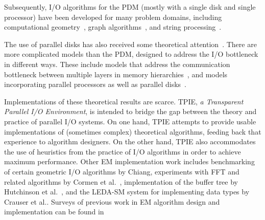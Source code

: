 Subsequently, I/O algorithms for the PDM (mostly with a
single disk and single processor) have been developed for
many problem domains, including computational
geometry~\cite{goodrich:external,arge:buffer,arge:theory,arge:gis,aamvv-empgbtag97,arge:interval,kanellakis:indexing,ramaswamy:path,subramanian:p-range,vengroff:efficient,agarwal:efficient,zhu:further,agarwal:point,arge:scalable,arge:theory,callahan:topology,franciosa:orders,grossi:cross-tree},
 graph
algorithms~\cite{chiang:external,arge:buffer,kumar:improved,abello:functional,crauser:randomized,arge:obdd,feuerstein:memory,nodine:blocking,ullman:input},
 and string
processing~\cite{ferragina:fully,ferragina:fast,arge:strings,crauser:construction}.

The use of parallel disks
 has also received
some theoretical
attention~\cite{vitter:parmem1,nodine:deterministic,nodine:greed,dehne:efficient,dehne:reducing}.
There are more complicated models than the PDM, designed to
address the I/O bottleneck in different ways. These include
models that address the communication bottleneck between
multiple layers in
memory hierarchies~\cite{}, and models incorporating
parallel processors as well as parallel
disks~\cite{cormen:challenge,dehne:efficient,dehne:reducing}.

Implementations of these theoretical results are scarce.
TPIE, {\em a Transparent Parallel I/O Environment}, is
intended to bridge the gap between the theory and practice
of parallel I/O systems. On one hand, TPIE attempts to
provide usable implementations of (sometimes complex)
theoretical algorithms, feeding back that experience to
algorithm designers. On the other hand, TPIE also
accommodates the use of heuristics from the practice of I/O
algorithms in order to achieve maximum performance. Other EM
implementation work includes benchmarking of certain
geometric I/O algorithms by Chiang\cite{chiang:experiments},
experiments with FFT and related algorithms by Cormen et
al.~\cite{cormen:ffts}, implementation of the buffer tree
\cite{arge:buffer} by Hutchinson et
al.~\cite{hutchinson:early}, and the LEDA-SM system for
implementing data types by Crauser et al.\cite{}.  Surveys
of previous work in EM algorithm design and implementation
can be found
in~\cite{arge:gisbook,arge:thesis,vitter:dimacssurvey}

